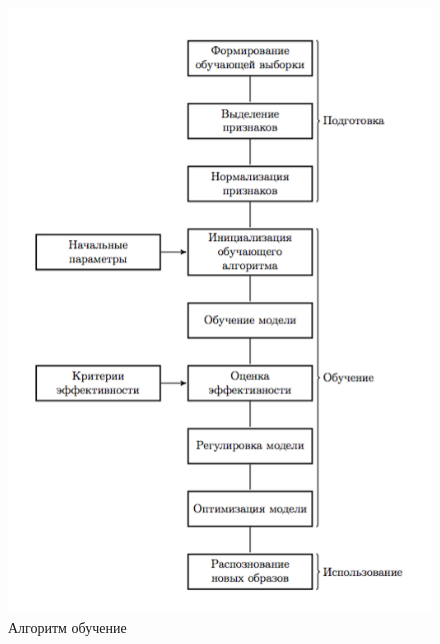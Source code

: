 \begin{figure}[ht]
    \centering
    \label{fig:develoipment:svm_flow}
    \includegraphics[width=1\textwidth]{figures/SVM_flow.png}
    \caption{Алгоритм обучение}
\end{figure}